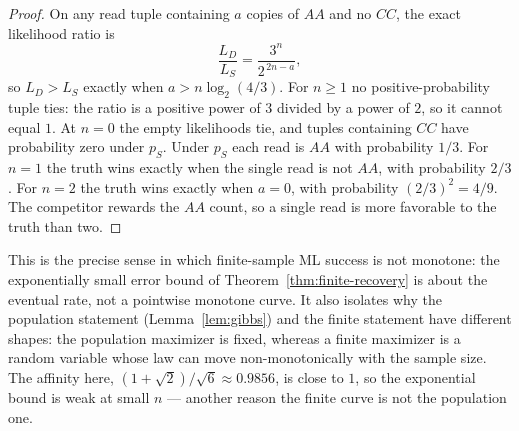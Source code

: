 \begin{proof}
On any read tuple containing $a$ copies of $AA$ and no $CC$, the exact
likelihood ratio is
\[
  \frac{L_D}{L_S} = \frac{3^n}{2^{\,2n-a}},
\]
so $L_D > L_S$ exactly when $a > n\log_2(4/3)$. For $n\ge1$ no positive-probability tuple ties: the ratio is a positive
power of $3$ divided by a power of $2$, so it cannot equal $1$.
At $n=0$ the empty likelihoods tie, and tuples containing $CC$ have
probability zero under $p_S$. Under $p_S$ each read is $AA$ with probability $1/3$. For $n=1$
the truth wins exactly when the single read is not $AA$, with probability
$2/3$. For $n=2$ the truth wins exactly when $a=0$, with probability
$(2/3)^2 = 4/9$. The competitor rewards the $AA$ count, so a single read is
more favorable to the truth than two.

\end{proof}

This is the precise sense in which finite-sample ML success is not monotone:
the exponentially small error bound of Theorem~\ref{thm:finite-recovery} is
about the eventual rate, not a pointwise monotone curve. It also isolates why
the population statement (Lemma~\ref{lem:gibbs}) and the finite statement have
different shapes: the population maximizer is fixed, whereas a finite
maximizer is a random variable whose law can move non-monotonically with the
sample size. The affinity here, $(1+\sqrt2)/\sqrt6 \approx 0.9856$, is close
to $1$, so the exponential bound is weak at small $n$ --- another reason the
finite curve is not the population one.
